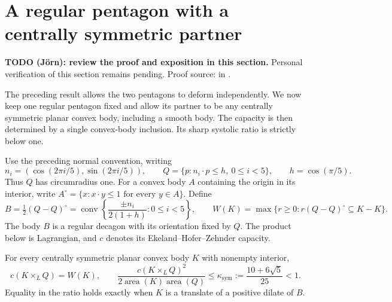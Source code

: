 \section{A regular pentagon with a centrally symmetric partner}
\label{sec:pentagon-symmetric-partner}

\begin{unverified}
\noindent\textbf{TODO (J\"orn): review the proof and exposition in this section.}
Personal verification of this section remains pending.
Proof source:
 in
.
\end{unverified}

The preceding result allows the two pentagons to deform independently.
We now keep one regular pentagon fixed and allow its partner to be any
centrally symmetric planar convex body, including a smooth body. The
capacity is then determined by a single convex-body inclusion. Its sharp
systolic ratio is strictly below one.

Use the preceding normal convention, writing
\[
 n_i=(\cos(2\pi i/5),\sin(2\pi i/5)),\qquad
 Q=\{p:n_i\cdot p\le h,\ 0\le i<5\},\qquad h=\cos(\pi/5).
\]
Thus $Q$ has circumradius one. For a convex body $A$ containing the origin
in its interior, write
$A^\circ=\{x:x\cdot y\le1\text{ for every }y\in A\}$.
Define
\[
 B=\tfrac12(Q-Q)^\circ
   =\operatorname{conv}\left\{\frac{\pm n_i}{2(1+h)}:0\le i<5\right\},
 \qquad
 W(K)=\max\{r\ge0:r(Q-Q)^\circ\subseteq K-K\}.
\]
The body $B$ is a regular decagon with its orientation fixed by $Q$.
The product below is Lagrangian, and $c$ denotes its
Ekeland--Hofer--Zehnder capacity.

\begin{theorem}\label{thm:pentagon-symmetric-partner}
For every centrally symmetric planar convex body $K$ with nonempty interior,
\[
 c(K\times_L Q)=W(K),\qquad
 \frac{c(K\times_L Q)^2}{2\operatorname{area}(K)\operatorname{area}(Q)}
 \le \kappa_{\mathrm{sym}}:=\frac{10+6\sqrt5}{25}<1.
\]
Equality in the ratio holds exactly when $K$ is a translate of a positive
dilate of $B$.
\end{theorem}

